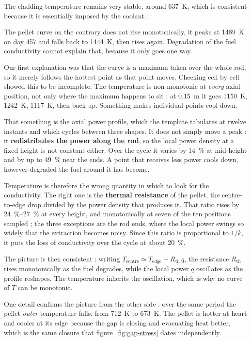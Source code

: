 \documentclass[12pt,a4paper]{report}
\begin{document}
The cladding temperature remains very stable, around \SI{637}{\kelvin},
which is consistent because it is essentially imposed by the coolant.

The pellet curve on the contrary does not rise monotonically, it peaks at \SI{1489}{\kelvin} on day
\num{457} and falls back to \SI{1444}{\kelvin}, then rises again. Degradation of
the fuel conductivity cannot explain that, because it only goes one way.

Our first explanation was that the curve is a maximum taken over the whole rod,
so it merely follows the hottest point as that point moves. Checking cell by
cell showed this to be incomplete. The temperature is non-monotonic at
\emph{every} axial position, not only where the maximum happens to sit : at
\SI{0.15}{\metre} it goes \SI{1150}{\kelvin}, \SI{1242}{\kelvin},
\SI{1117}{\kelvin}, then back up. Something makes individual points cool down.

That something is the axial power profile, which the template tabulates at
twelve instants and which cycles between three shapes. It does not simply move
a peak : it \textbf{redistributes the power along the rod}, so the local power
density at a fixed height is not constant either. Over the cycle it varies by
\SI{14}{\percent} at mid-height and by up to \SI{49}{\percent} near the ends.
A point that receives less power cools down, however degraded the fuel around it
has become.

Temperature is therefore the wrong quantity in which to look for the
conductivity. The right one is the \textbf{thermal resistance} of the pellet,
the centre-to-edge drop divided by the power density that produces it. That
ratio rises by \SIrange{24}{27}{\percent} at every height, and monotonically at
seven of the ten positions sampled ; the three exceptions are the rod ends,
where the local power swings so widely that the extraction becomes noisy. Since
this ratio is proportional to $1/k$, it puts the loss of conductivity over the
cycle at about \SI{20}{\percent}.

The picture is then consistent : writing
$T_{\text{centre}} \simeq T_{\text{edge}} + R_{\text{th}}\,q$, the resistance
$R_{\text{th}}$ rises monotonically as the fuel degrades, while the local power
$q$ oscillates as the profile reshapes. The temperature inherits the
oscillation, which is why no curve of $T$ can be monotonic.

One detail confirms the picture from the other side : over the same period the
pellet \emph{outer} temperature falls, from \SI{712}{\kelvin} to
\SI{673}{\kelvin}. The pellet is hotter at heart and cooler at its edge because
the gap is closing and evacuating heat better, which is the same closure that
figure~\ref{fig:gap-stress} dates independently.
\end{document}
